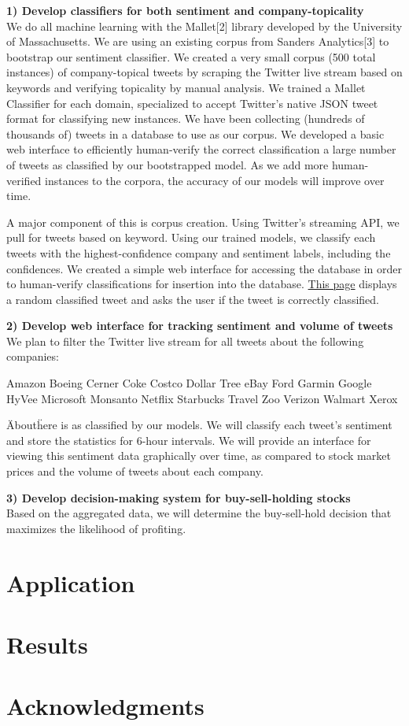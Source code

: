 \documentclass[letterpaper]{article}
\begin{document}
\textbf{1) Develop classifiers for both sentiment and company-topicality} \\
We do all machine learning with the Mallet[2] library developed by the University of Massachusetts. We are using an existing corpus from Sanders Analytics[3] to bootstrap our sentiment classifier. We created a very small corpus (500 total instances) of company-topical tweets by scraping the Twitter live stream based on keywords and verifying topicality by manual analysis. We trained a Mallet Classifier for each domain, specialized to accept Twitter's native JSON tweet format for classifying new instances. We have been collecting (hundreds of thousands of) tweets in a database to use as our corpus. We developed a basic web interface to efficiently human-verify the correct classification a large number of tweets as classified by our bootstrapped model. As we add more human-verified instances to the corpora, the accuracy of our models will improve over time.

A major component of this is corpus creation. Using Twitter's streaming API, we pull for tweets based on keyword. Using our trained models, we classify each tweets with the highest-confidence company and sentiment labels, including the confidences. We created a simple web interface for accessing the database in order to human-verify classifications for insertion into the database. \href{http://danielstiner.com:9001/company-yes-no.html#/classified/random/company/confidence/.2:1/count/1}{This page} displays a random classified tweet and asks the user if the tweet is correctly classified.

\textbf{2) Develop web interface for tracking sentiment and volume of tweets} \\
We plan to filter the Twitter live stream for all tweets about the following companies:

Amazon Boeing Cerner Coke Costco Dollar Tree eBay Ford Garmin Google HyVee Microsoft Monsanto Netflix Starbucks Travel Zoo Verizon Walmart Xerox

\"About\" here is as classified by our models. We will classify each tweet's sentiment and store the statistics for 6-hour intervals. We will provide an interface for viewing this sentiment data graphically over time, as compared to stock market prices and the volume of tweets about each company.

\textbf{3) Develop decision-making system for buy-sell-holding stocks}\\
Based on the aggregated data, we will determine the buy-sell-hold decision that maximizes the likelihood of profiting.

\section{Application}

\section{Results}


\section{ Acknowledgments}
\end{document}
